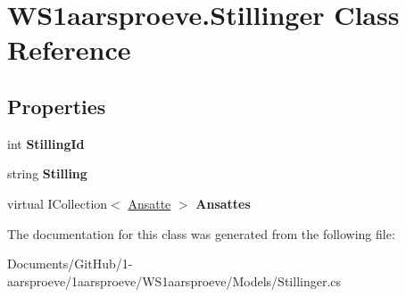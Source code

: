 \hypertarget{class_w_s1aarsproeve_1_1_stillinger}{}\section{W\+S1aarsproeve.\+Stillinger Class Reference}
\label{class_w_s1aarsproeve_1_1_stillinger}
\subsection*{Properties}
\begin{DoxyCompactItemize}
\item 
\hypertarget{class_w_s1aarsproeve_1_1_stillinger_a5b6362128a503cddc2b5aad7312bf235}{}int {\bfseries Stilling\+Id}\label{class_w_s1aarsproeve_1_1_stillinger_a5b6362128a503cddc2b5aad7312bf235}

\item 
\hypertarget{class_w_s1aarsproeve_1_1_stillinger_a661d6d4f5bfc9e65a2d6a3c32f681695}{}string {\bfseries Stilling}\label{class_w_s1aarsproeve_1_1_stillinger_a661d6d4f5bfc9e65a2d6a3c32f681695}

\item 
\hypertarget{class_w_s1aarsproeve_1_1_stillinger_ae2b7ade27eaa3ce08317274dcf155cc5}{}virtual I\+Collection$<$ \hyperlink{class_w_s1aarsproeve_1_1_ansatte}{Ansatte} $>$ {\bfseries Ansattes}\label{class_w_s1aarsproeve_1_1_stillinger_ae2b7ade27eaa3ce08317274dcf155cc5}

\end{DoxyCompactItemize}


The documentation for this class was generated from the following file\+:\begin{DoxyCompactItemize}
\item 
Documents/\+Git\+Hub/1-\/aarsproeve/1aarsproeve/\+W\+S1aarsproeve/\+Models/Stillinger.\+cs\end{DoxyCompactItemize}
